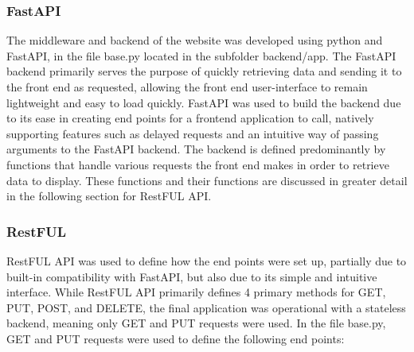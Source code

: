 \documentclass{article}
\begin{document}
\subsubsection*{FastAPI}
The middleware and backend of the website was developed using python and FastAPI, in the file base.py located in the subfolder backend/app. The FastAPI backend primarily serves the purpose of quickly retrieving data and sending it to the front end as requested, allowing the front end user-interface to remain lightweight and easy to load quickly. FastAPI was used to build the backend due to its ease in creating end points for a frontend application to call, natively supporting features such as delayed requests and an intuitive way of passing arguments to the FastAPI backend.
The backend is defined predominantly by functions that handle various requests the front end makes in order to retrieve data to display. These functions and their functions are discussed in greater detail in the following section for RestFUL API.

\subsubsection*{RestFUL}
RestFUL API was used to define how the end points were set up, partially due to built-in compatibility with FastAPI, but also due to its simple and intuitive interface. While RestFUL API primarily defines 4 primary methods for GET, PUT, POST, and DELETE, the final application was operational with a stateless backend, meaning only GET and PUT requests were used.
In the file base.py, GET and PUT requests were used to define the following end points:
\end{document}
